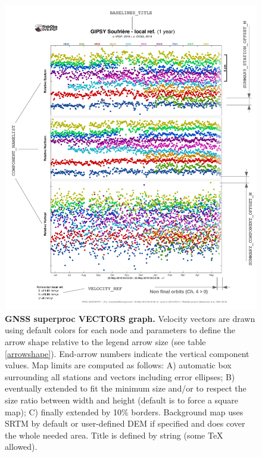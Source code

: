 \begin{figure}
\centering
\includegraphics[width=\textwidth,page=4]{figures/gnss_superproc.pdf}
\caption{\textbf{GNSS superproc VECTORS graph.} Velocity vectors are drawn using default colors for each node and  parameters to define the arrow shape relative to the legend arrow size (see table \ref{arrowshape}). End-arrow numbers indicate the vertical component values. Map limits are computed as follows: A) automatic box surrounding all stations and vectors including error ellipses; B) eventually extended to fit the  minimum size and/or to respect the  size ratio between width and height (default is  to force a square map); C) finally extended by 10\% borders. Background map uses SRTM by default or user-defined DEM if specified and does cover the whole needed area. Title is defined by  string (some TeX allowed).}
\label{gnss_vectors}
\end{figure}



